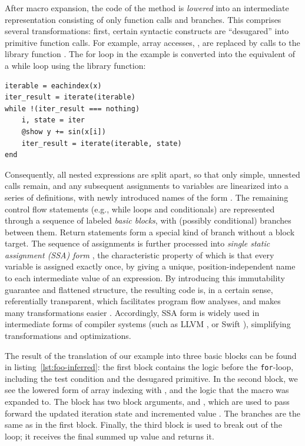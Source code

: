 After macro expansion, the code of the method is \emph{lowered} into an intermediate representation
consisting of only function calls and branches.  This comprises several transformations: first,
certain syntactic constructs are \enquote{desugared} into primitive function calls.  For example,
array accesses, , are replaced by calls to the library function .
The for loop in the example is converted into the equivalent of a while loop using the
 library function:
\begin{lstlisting}
iterable = eachindex(x)
iter_result = iterate(iterable)
while !(iter_result === nothing)
    i, state = iter
    @show y += sin(x[i])
    iter_result = iterate(iterable, state)
end
\end{lstlisting}
Consequently, all nested expressions are split apart, so that only simple, unnested calls remain,
and any subsequent assignments to variables are linearized into a series of definitions, with newly
introduced names of the form .  The remaining control flow statements (e.g., while loops
and conditionals) are represented through a sequence of labeled \emph{basic blocks}, with (possibly
conditional) branches between them.  Return statements form a special kind of branch without a block
target.  The sequence of assignments is further processed into \emph{single static assignment (SSA)
  form} \parencite{rosen1988global,singer2018static}, the characteristic property of which is that
every variable is assigned exactly once, by giving a unique, position-independent name to each
intermediate value of an expression.  By introducing this immutability guarantee and flattened
structure, the resulting code is, in a certain sense, referentially transparent, which facilitates
program flow analyses, and makes many transformations easier \parencite{muchnick1997advanced}.
Accordingly, SSA form is widely used in intermediate forms of compiler systems (such as LLVM
\parencite{llvmproject2019llvm}, or Swift \parencite{apple2020swifta}), simplifying transformations
and optimizations.

The result of the translation of our example into three basic blocks can be found in
listing~\ref{lst:foo-inferred}: the first block contains the logic before the \texttt{for}-loop,
including the test condition and the desugared  primitive.  In the second block, we
see the lowered form of array indexing with , and the logic that the 
macro was expanded to.  The block has two block arguments,  and , which are
used to pass forward the updated iteration state  and incremented value .
The branches are the same as in the first block.  Finally, the third block is used to break out of
the loop; it receives the final summed up value and returns it.

